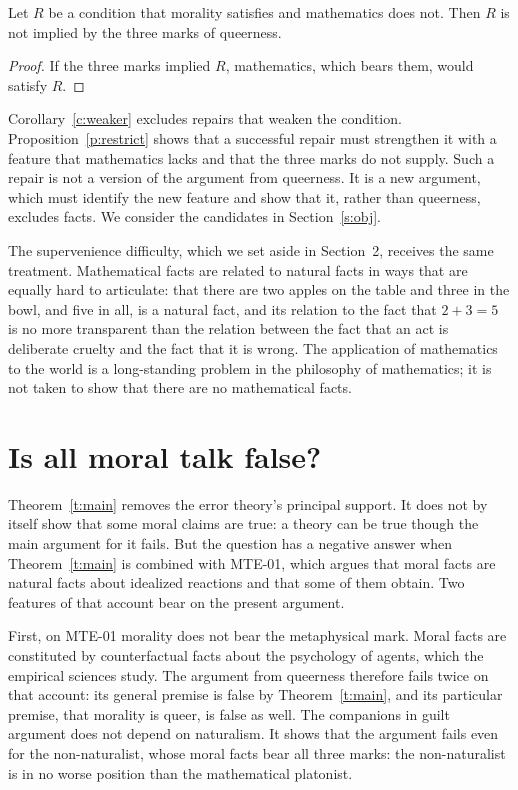 \documentclass{situationist-preprint}
\begin{document}
\begin{proposition}\label{p:restrict}
Let $R$ be a condition that morality satisfies and mathematics does not. Then $R$ is not implied by the three marks of queerness.
\end{proposition}

\begin{proof}
If the three marks implied $R$, mathematics, which bears them, would satisfy $R$.
\end{proof}

Corollary~\ref{c:weaker} excludes repairs that weaken the condition. Proposition~\ref{p:restrict} shows that a successful repair must strengthen it with a feature that mathematics lacks and that the three marks do not supply. Such a repair is not a version of the argument from queerness. It is a new argument, which must identify the new feature and show that it, rather than queerness, excludes facts. We consider the candidates in Section~\ref{s:obj}.

The supervenience difficulty, which we set aside in Section~2, receives the same treatment. Mathematical facts are related to natural facts in ways that are equally hard to articulate: that there are two apples on the table and three in the bowl, and five in all, is a natural fact, and its relation to the fact that $2 + 3 = 5$ is no more transparent than the relation between the fact that an act is deliberate cruelty and the fact that it is wrong. The application of mathematics to the world is a long-standing problem in the philosophy of mathematics; it is not taken to show that there are no mathematical facts.

\section{Is all moral talk false?}

Theorem~\ref{t:main} removes the error theory's principal support. It does not by itself show that some moral claims are true: a theory can be true though the main argument for it fails. But the question has a negative answer when Theorem~\ref{t:main} is combined with MTE-01, which argues that moral facts are natural facts about idealized reactions and that some of them obtain. Two features of that account bear on the present argument.

First, on MTE-01 morality does not bear the metaphysical mark. Moral facts are constituted by counterfactual facts about the psychology of agents, which the empirical sciences study. The argument from queerness therefore fails twice on that account: its general premise is false by Theorem~\ref{t:main}, and its particular premise, that morality is queer, is false as well. The companions in guilt argument does not depend on naturalism. It shows that the argument fails even for the non-naturalist, whose moral facts bear all three marks: the non-naturalist is in no worse position than the mathematical platonist.
\end{document}
